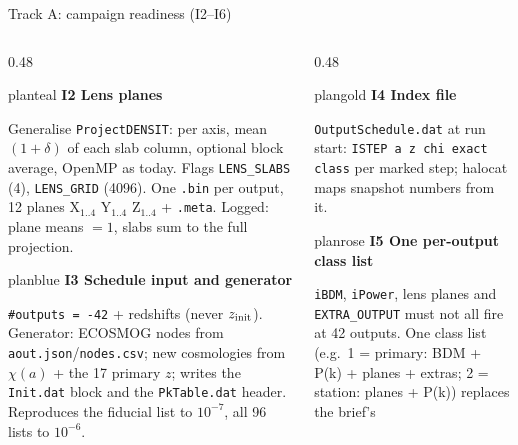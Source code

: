 \documentclass[UTF8]{beamer}
\begin{document}
\begin{frame}{Track A: campaign readiness (I2--I6)}
  \footnotesize
  \begin{columns}[T,totalwidth=\textwidth]
    \begin{column}{0.48\textwidth}
      \begin{phasebox}{planteal}
        {\color{planteal}\bfseries I2 Lens planes}\par\smallskip
        \scriptsize
        Generalise \texttt{ProjectDENSIT}: per axis, mean $(1+\delta)$ of each slab column, optional block average, OpenMP as today.
        Flags \texttt{LENS\_SLABS} (4), \texttt{LENS\_GRID} (4096). One \texttt{.bin} per output, 12 planes X$_{1..4}$ Y$_{1..4}$ Z$_{1..4}$ + \texttt{.meta}.
        Logged: plane means $= 1$, slabs sum to the full projection.
      \end{phasebox}
      \vspace{0.3ex}
      \begin{phasebox}{planblue}
        {\color{planblue}\bfseries I3 Schedule input and generator}\par\smallskip
        \scriptsize
        \texttt{\#outputs = -42} + redshifts (never $z_{\rm init}$). Generator: ECOSMOG nodes from \texttt{aout.json}/\texttt{nodes.csv};
        new cosmologies from $\chi(a)$ + the 17 primary $z$; writes the \texttt{Init.dat} block and the \texttt{PkTable.dat} header.
        Reproduces the fiducial list to $10^{-7}$, all 96 lists to $10^{-6}$.
      \end{phasebox}
    \end{column}
    \hfill
    \begin{column}{0.48\textwidth}
      \begin{phasebox}{plangold}
        {\color{plangold}\bfseries I4 Index file}\par\smallskip
        \scriptsize
        \texttt{OutputSchedule.dat} at run start: \texttt{ISTEP a z chi exact class} per marked step; halocat maps snapshot numbers from it.
      \end{phasebox}
      \vspace{0.3ex}
      \begin{phasebox}{planrose}
        {\color{planrose}\bfseries I5 One per-output class list}\par\smallskip
        \scriptsize
        \texttt{iBDM}, \texttt{iPower}, lens planes and \texttt{EXTRA\_OUTPUT} must not all fire at 42 outputs.
        One class list (e.g.\ 1 = primary: BDM + P(k) + planes + extras; 2 = station: planes + P(k)) replaces the brief's

\end{phasebox}
\end{column}
\end{columns}
\end{frame}
\end{document}
